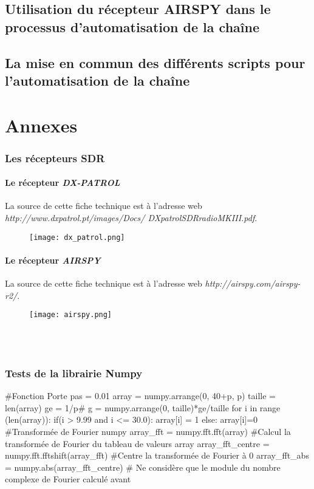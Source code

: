 \documentclass[12pt,fleqn]{book} %
\begin{document}
\chapter{Utilisation du récepteur AIRSPY dans le processus d'automatisation de la chaîne}
\chapter{La mise en commun des différents scripts pour l'automatisation de la chaîne}





\setcounter{part}{-5}
\part{Annexes}
\section{Les récepteurs SDR}
\subsection{Le récepteur \emph{DX-PATROL}}
La source de cette fiche technique est à l'adresse web \emph{http://www.dxpatrol.pt/images/Docs/ DXpatrolSDRradioMKIII.pdf}.
\begin{figure}[H]
	\centering
	\texttt{[image: dx\_patrol.png]}
 \end{figure}
\subsection{Le récepteur \emph{AIRSPY}}
La source de cette fiche technique est à l'adresse web \emph{http://airspy.com/airspy-r2/}.
 \begin{figure}[H]
	\centering
	\texttt{[image: airspy.png]}
 \end{figure}
~\\\\
\section{Tests de la librairie Numpy}
\begin{python}
 #Fonction Porte
 pas = 0.01
 array = numpy.arrange(0, 40+p, p)
 taille = len(array)
 ge = 1/p#
 g = numpy.arrange(0, taille)*ge/taille
 for i in range (len(array)):
     if(i > 9.99 and i <= 30.0):
          array[i] = 1
      else:
          array[i]=0
 #Transformée de Fourier numpy
 array_fft = numpy.fft.fft(array) #Calcul la transformée de Fourier du tableau de valeurs array
 array_fft_centre = numpy.fft.fftshift(array_fft) #Centre la transformée de Fourier à 0
 array_fft_abs = numpy.abs(array_fft_centre) # Ne considère que le module du nombre complexe de Fourier calculé avant
\end{python}
\setcounter{part}{-6}
\end{document}
